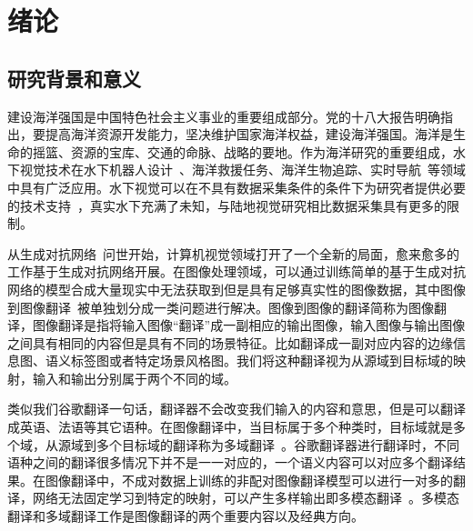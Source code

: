 \chapter{绪论}
\section{研究背景和意义}

建设海洋强国是中国特色社会主义事业的重要组成部分。党的十八大报告明确指出，要提高海洋资源开发能力，坚决维护国家海洋权益，建设海洋强国。海洋是生命的摇篮、资源的宝库、交通的命脉、战略的要地。作为海洋研究的重要组成，水下视觉技术在水下机器人设计~\cite{kim2012object,li2020object}、海洋救援任务、海洋生物追踪、实时导航~\cite{chen2012real}等领域中具有广泛应用。水下视觉可以在不具有数据采集条件的条件下为研究者提供必要的技术支持~\cite{ludvigsen2007applications,万媛媛2012水下光视觉目标检测与定位系统关键技术研究}，真实水下充满了未知，与陆地视觉研究相比数据采集具有更多的限制。

从生成对抗网络~\cite{goodfellow2014generative}问世开始，计算机视觉领域打开了一个全新的局面，愈来愈多的工作基于生成对抗网络开展。在图像处理领域，可以通过训练简单的基于生成对抗网络的模型合成大量现实中无法获取到但是具有足够真实性的图像数据，其中图像到图像翻译~\cite{isola2017image}被单独划分成一类问题进行解决。图像到图像的翻译简称为图像翻译，图像翻译是指将输入图像“翻译”成一副相应的输出图像，输入图像与输出图像之间具有相同的内容但是具有不同的场景特征。比如翻译成一副对应内容的边缘信息图、语义标签图或者特定场景风格图。我们将这种翻译视为从源域到目标域的映射，输入和输出分别属于两个不同的域。


类似我们谷歌翻译一句话，翻译器不会改变我们输入的内容和意思，但是可以翻译成英语、法语等其它语种。在图像翻译中，当目标属于多个种类时，目标域就是多个域，从源域到多个目标域的翻译称为多域翻译~\cite{choi2018stargan,choi2020stargan,lee2020drit++}。谷歌翻译器进行翻译时，不同语种之间的翻译很多情况下并不是一一对应的，一个语义内容可以对应多个翻译结果。在图像翻译中，不成对数据上训练的非配对图像翻译模型可以进行一对多的翻译，网络无法固定学习到特定的映射，可以产生多样输出即多模态翻译~\cite{huang2018multimodal,lee2018diverse,lee2020drit++}。多模态翻译和多域翻译工作是图像翻译的两个重要内容以及经典方向。

